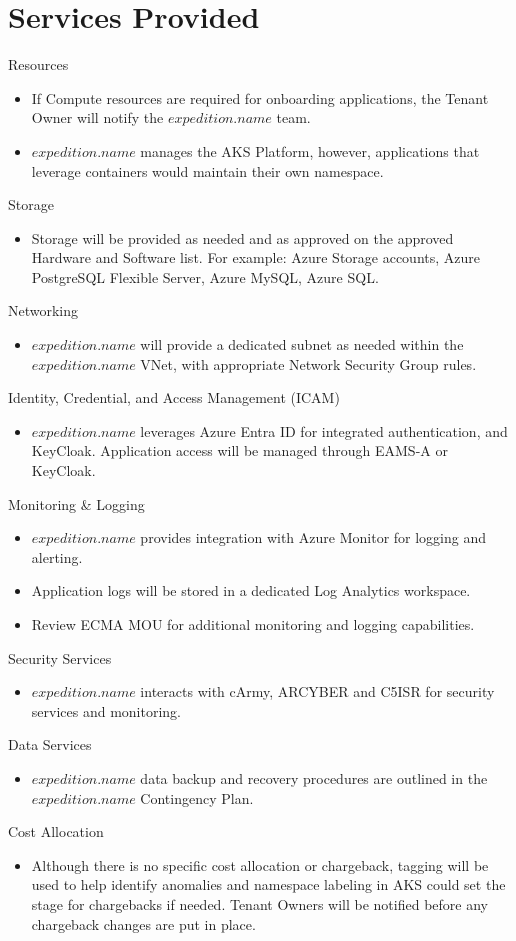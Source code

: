 \documentclass[11pt]{article}
\begin{document}
  \section*{Services Provided}
    Resources 
    \begin{itemize}
      \item If Compute resources are required for onboarding applications, the Tenant Owner will notify the $expedition.name$ team.
      \item $expedition.name$ manages the AKS Platform, however, applications that leverage containers would maintain their own namespace.
    \end{itemize}
    Storage
    \begin{itemize}
      \item Storage will be provided as needed and as approved on the approved Hardware and Software list. For example: Azure Storage accounts, Azure PostgreSQL Flexible Server, Azure MySQL, Azure SQL.
    \end{itemize}
    Networking
    \begin{itemize} 
      \item	$expedition.name$ will provide a dedicated subnet as needed within the $expedition.name$ VNet, with appropriate Network Security Group rules.
    \end{itemize}
    Identity, Credential, and Access Management (ICAM)
    \begin{itemize}
      \item $expedition.name$ leverages Azure Entra ID for integrated authentication, and KeyCloak. Application access will be managed through EAMS-A or KeyCloak.
    \end{itemize}
    Monitoring \& Logging
    \begin{itemize}
      \item $expedition.name$ provides integration with Azure Monitor for logging and alerting. 
      \item Application logs will be stored in a dedicated Log Analytics workspace.
      \item Review ECMA MOU for additional monitoring and logging capabilities.
    \end{itemize}
    Security Services
    \begin{itemize}
      \item $expedition.name$ interacts with cArmy, ARCYBER and C5ISR for security services and monitoring.
    \end{itemize}
    Data Services
    \begin{itemize}
      \item $expedition.name$ data backup and recovery procedures are outlined in the $expedition.name$ Contingency Plan. 
    \end{itemize}
    Cost Allocation
    \begin{itemize}
      \item Although there is no specific cost allocation or chargeback, tagging will be used to help identify anomalies and namespace labeling in AKS could set the stage for chargebacks if needed. Tenant Owners will be notified before any chargeback changes are put in place.
    \end{itemize}
\end{document}
